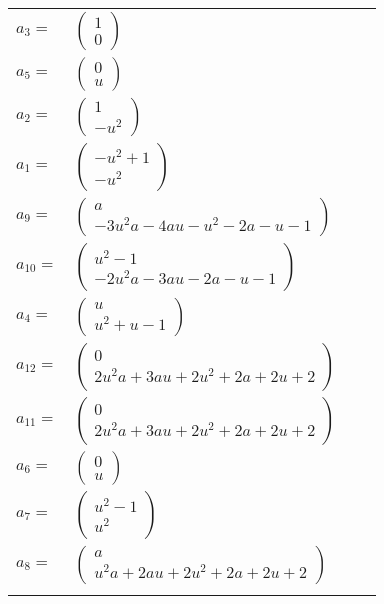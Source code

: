 \documentclass[1p]{elsarticle_modified}
\theoremstyle{definition}
\begin{document}
\begin{tabular}{m{7pt} m{180pt} m{7pt} m{180pt} }
\flushright $a_{3}=$&$\begin{pmatrix}1\\0\end{pmatrix}$ \\
\flushright $a_{5}=$&$\begin{pmatrix}0\\u\end{pmatrix}$ \\
\flushright $a_{2}=$&$\begin{pmatrix}1\\- u^2\end{pmatrix}$ \\
\flushright $a_{1}=$&$\begin{pmatrix}- u^2+1\\- u^2\end{pmatrix}$ \\
\flushright $a_{9}=$&$\begin{pmatrix}a\\-3 u^2 a-4 a u- u^2-2 a- u-1\end{pmatrix}$ \\
\flushright $a_{10}=$&$\begin{pmatrix}u^2-1\\-2 u^2 a-3 a u-2 a- u-1\end{pmatrix}$ \\
\flushright $a_{4}=$&$\begin{pmatrix}u\\u^2+u-1\end{pmatrix}$ \\
\flushright $a_{12}=$&$\begin{pmatrix}0\\2 u^2 a+3 a u+2 u^2+2 a+2 u+2\end{pmatrix}$ \\
\flushright $a_{11}=$&$\begin{pmatrix}0\\2 u^2 a+3 a u+2 u^2+2 a+2 u+2\end{pmatrix}$ \\
\flushright $a_{6}=$&$\begin{pmatrix}0\\u\end{pmatrix}$ \\
\flushright $a_{7}=$&$\begin{pmatrix}u^2-1\\u^2\end{pmatrix}$ \\
\flushright $a_{8}=$&$\begin{pmatrix}a\\u^2 a+2 a u+2 u^2+2 a+2 u+2\end{pmatrix}$\\&\end{tabular}
\end{document}
